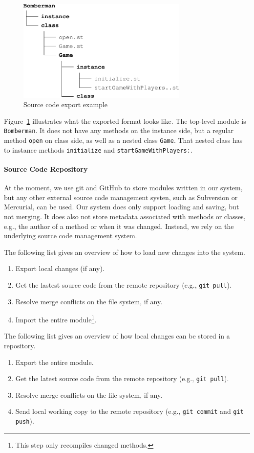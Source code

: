 \begin{figure}[!htp]
	\centering
	\includegraphics[width=0.75\textwidth]{source_code_ex.pdf}
	\caption{Source code export example}
	\label{fig:impl_source_export}
\end{figure}

Figure~\ref{fig:impl_source_export} illustrates what the exported format looks like. The top-level module is \texttt{Bomberman}. It does not have any methods on the instance side, but a regular method \texttt{open} on class side, as well as a nested class \texttt{Game}. That nested class has to instance methods \texttt{initialize} and \texttt{startGameWithPlayers:}.

\paragraph{Source Code Repository}
At the moment, we use git and GitHub to store modules written in our system, but any other external source code management systen, such as Subversion or Mercurial, can be used. Our system does only support loading and saving, but not merging. It does also not store metadata associated with methods or classes, e.g., the author of a method or when it was changed. Instead, we rely on the underlying source code management system.

The following list gives an overview of how to load new changes into the system.
\begin{enumerate}
	\item Export local changes (if any).
	\item Get the lastest source code from the remote repository (e.g., \texttt{git pull}).
	\item Resolve merge conflicts on the file system, if any.
	\item Import the entire module\footnote{This step only recompiles changed methods.}.
\end{enumerate}

The following list gives an overview of how local changes can be stored in a repository.
\begin{enumerate}
	\item Export the entire module.
	\item Get the latest source code from the remote repository (e.g., \texttt{git pull}).
	\item Resolve merge conflicts on the file system, if any.
	\item Send local working copy to the remote repository (e.g., \texttt{git commit} and \texttt{git push}).
\end{enumerate}
